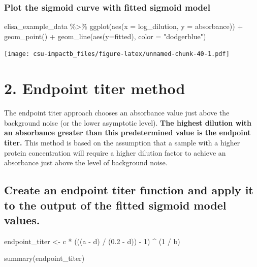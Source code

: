 \documentclass[
]{book}
\newenvironment{Shaded}{\begin{snugshade}}{\end{snugshade}}
\newcommand{\AttributeTok}[1]{\textcolor[rgb]{0.77,0.63,0.00}{#1}}
\newcommand{\DecValTok}[1]{\textcolor[rgb]{0.00,0.00,0.81}{#1}}
\newcommand{\FloatTok}[1]{\textcolor[rgb]{0.00,0.00,0.81}{#1}}
\newcommand{\FunctionTok}[1]{\textcolor[rgb]{0.00,0.00,0.00}{#1}}
\newcommand{\NormalTok}[1]{#1}
\newcommand{\OtherTok}[1]{\textcolor[rgb]{0.56,0.35,0.01}{#1}}
\newcommand{\SpecialCharTok}[1]{\textcolor[rgb]{0.00,0.00,0.00}{#1}}
\newcommand{\StringTok}[1]{\textcolor[rgb]{0.31,0.60,0.02}{#1}}
\begin{document}
\hypertarget{plot-the-sigmoid-curve-with-fitted-sigmoid-model}{%
\subsubsection{Plot the sigmoid curve with fitted sigmoid model}\label{plot-the-sigmoid-curve-with-fitted-sigmoid-model}}

\begin{Shaded}
\begin{Highlighting}[]
\NormalTok{elisa\_example\_data }\SpecialCharTok{\%\textgreater{}\%}
  \FunctionTok{ggplot}\NormalTok{(}\FunctionTok{aes}\NormalTok{(}\AttributeTok{x =}\NormalTok{ log\_dilution, }\AttributeTok{y =}\NormalTok{ absorbance)) }\SpecialCharTok{+}
  \FunctionTok{geom\_point}\NormalTok{() }\SpecialCharTok{+}
  \FunctionTok{geom\_line}\NormalTok{(}\FunctionTok{aes}\NormalTok{(}\AttributeTok{y=}\NormalTok{fitted), }\AttributeTok{color =} \StringTok{"dodgerblue"}\NormalTok{)}
\end{Highlighting}
\end{Shaded}

\texttt{[image: csu-impactb\_files/figure-latex/unnamed-chunk-40-1.pdf]}

\hypertarget{endpoint-titer-method}{%
\section{2. Endpoint titer method}\label{endpoint-titer-method}}

The endpoint titer approach chooses an absorbance value just above the background noise (or the lower asymptotic level). \textbf{The highest dilution with an absorbance greater than this predetermined value is the endpoint titer.} This method is based on the assumption that a sample with a higher protein concentration will require a higher dilution factor to achieve an absorbance just above the level of background noise.

\hypertarget{create-an-endpoint-titer-function-and-apply-it-to-the-output-of-the-fitted-sigmoid-model-values.}{%
\subsection{Create an endpoint titer function and apply it to the output of the fitted sigmoid model values.}\label{create-an-endpoint-titer-function-and-apply-it-to-the-output-of-the-fitted-sigmoid-model-values.}}

\begin{Shaded}
\begin{Highlighting}[]
\NormalTok{endpoint\_titer }\OtherTok{\textless{}{-}}\NormalTok{ c }\SpecialCharTok{*}\NormalTok{ (((a }\SpecialCharTok{{-}}\NormalTok{ d) }\SpecialCharTok{/}\NormalTok{ (}\FloatTok{0.2} \SpecialCharTok{{-}}\NormalTok{ d)) }\SpecialCharTok{{-}} \DecValTok{1}\NormalTok{) }\SpecialCharTok{\^{}}\NormalTok{ (}\DecValTok{1} \SpecialCharTok{/}\NormalTok{ b)}

\FunctionTok{summary}\NormalTok{(endpoint\_titer)}
\end{Highlighting}
\end{Shaded}
\end{document}
